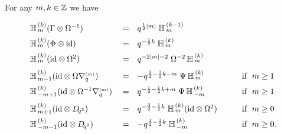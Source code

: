 \begin{lemma} \label{lemma:YaH:properties}
For any\/ $m,k\in\mathbb{Z}$ we have
$$\begin{array}{lclcl}
\YaH{m}{k} (\Gamma \tens \Omega^{-1})
          &\vertXL =&   q^{\frac{1}{2}|m|}\; \YaH{m}{k-1}  \\
\YaH{m}{k} (\Phi \tens \id)
          &\vertXL =&   q^{-\frac{1}{2}k}\; \YaH{m}{k}     \\
\YaH{m}{k} (\id \tens \Omega^2)
          &\vertXL =&   q^{-2|m|-2}\; \Omega^{-2} \, \YaH{m}{k}     \\
\YaH{m-1}{k} (\id \tens \Omega \nabq{m})
          &\vertXXL =&  -q^{\frac{3}{2} -\frac{1}{2}k -m} \; \Psi \,\YaH{m}{k}
          &  \hspace{1em} &  {\rm if}\;\; m\geq 1     \\
\YaH{-m+1}{k} (\id \tens \Omega^{-1} \nabq{m})
          &\vertXL =&   q^{-\frac{1}{2} -\frac{1}{2}k + m} \; \Psi \, \YaH{-m}{k}
          &  \hspace{1em} &  {\rm if}\;\; m\geq 1     \\
\YaH{m+1}{k} (\id \tens \Dqsqr)
          &\vertXXL =&  q^{-\frac{3}{2} -\frac{1}{2}k} \;
          \YaH{m}{k} (\id \tens \Omega^2)
          &  \hspace{1em} &  {\rm if}\;\; m\geq 0     \\
\YaH{-m-1}{k} (\id \tens \Dqsqr)
          &\vertXL =&  -q^{\frac{1}{2} -\frac{1}{2}k} \; \YaH{-m}{k}
          &  \hspace{1em} &  {\rm if}\;\; m\geq 0.
\end{array}$$
\end{lemma}
\vspace{2ex}


